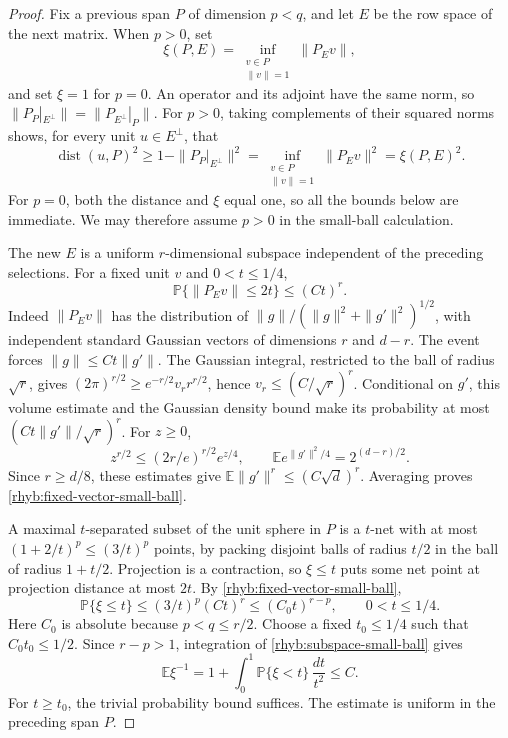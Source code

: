 \begin{proof}
Fix a previous span \(P\) of dimension \(p<q\), and let \(E\) be the row
space of the next matrix.  When \(p>0\), set
\[
 \xi(P,E)=\inf_{\substack{v\in P\\\|v\|=1}}\|P_Ev\|,
\]
and set \(\xi=1\) for \(p=0\).  An operator and its adjoint have the same
norm, so
\(\|P_P|_{E^\perp}\|=\|P_{E^\perp}|_P\|\).  For \(p>0\), taking
complements of their squared norms shows, for every unit \(u\in E^\perp\),
that
\begin{equation}\label{rhyb:adjoint}
 \operatorname{dist}(u,P)^2
 \ge1-\|P_P|_{E^\perp}\|^2
 =\inf_{\substack{v\in P\\\|v\|=1}}\|P_Ev\|^2
 =\xi(P,E)^2.
\end{equation}
For \(p=0\), both the distance and \(\xi\) equal one, so all the bounds
below are immediate.  We may therefore assume \(p>0\) in the small-ball
calculation.

The new \(E\) is a uniform \(r\)-dimensional subspace independent of
the preceding selections.  For a fixed unit \(v\) and \(0<t\le1/4\),
\begin{equation}\label{rhyb:fixed-vector-small-ball}
 \mathbb P\{\|P_Ev\|\le2t\}\le(Ct)^r.
\end{equation}
Indeed \(\|P_Ev\|\) has the distribution of
\(\|g\|/(\|g\|^2+\|g'\|^2)^{1/2}\), with independent standard Gaussian
vectors of dimensions \(r\) and \(d-r\).  The event forces
\(\|g\|\le Ct\|g'\|\).  The Gaussian integral, restricted to the ball
of radius \(\sqrt r\), gives
\((2\pi)^{r/2}\ge e^{-r/2}v_r r^{r/2}\), hence
\(v_r\le(C/\sqrt r)^r\).  Conditional on \(g'\), this volume estimate
and the Gaussian density bound make its probability at most
\((Ct\|g'\|/\sqrt r)^r\).
For \(z\ge0\),
\[
 z^{r/2}\le(2r/e)^{r/2}e^{z/4},
 \qquad
 \mathbb E e^{\|g'\|^2/4}=2^{(d-r)/2}.
\]
Since \(r\ge d/8\), these estimates give
\(\mathbb E\|g'\|^r\le(C\sqrt d)^r\).  Averaging proves
\eqref{rhyb:fixed-vector-small-ball}.

A maximal \(t\)-separated subset of the unit sphere in \(P\) is a
\(t\)-net with at most \((1+2/t)^p\le(3/t)^p\) points, by packing
disjoint balls of radius \(t/2\) in the ball of radius \(1+t/2\).
Projection is a contraction, so \(\xi\le t\) puts some net point at
projection distance at most \(2t\).  By \eqref{rhyb:fixed-vector-small-ball},
\begin{equation}\label{rhyb:subspace-small-ball}
 \mathbb P\{\xi\le t\}\le(3/t)^p(Ct)^r
 \le(C_0t)^{r-p},\qquad 0<t\le1/4.
\end{equation}
Here \(C_0\) is absolute because \(p<q\le r/2\).
Choose a fixed \(t_0\le1/4\) such that \(C_0t_0\le1/2\).
Since \(r-p>1\), integration of \eqref{rhyb:subspace-small-ball} gives
\[
 \mathbb E\xi^{-1}
 =1+\int_0^1\mathbb P\{\xi<t\}\,\frac{dt}{t^2}
 \le C.
\]
For \(t\ge t_0\), the trivial probability bound suffices.
The estimate is uniform in the preceding span \(P\).


\end{proof}
